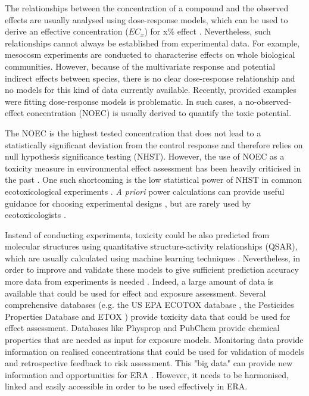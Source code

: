 The relationships between the concentration of a compound and the observed effects are usually analysed using dose-response models, which can be used to derive an effective concentration ($EC_{x}$) for x\% effect  \citep{ritz_toward_2010}. 
Nevertheless, such relationships cannot always be established from experimental data.
For example, mesocosm experiments are conducted to characterise effects on whole biological communities.
However, because of the multivariate response and potential indirect effects between species, there is no clear dose-response relationship and no models for this kind of data currently available. 
Recently, \citet{green_issues_2016} provided examples were fitting dose-response models is problematic. 
In such cases, a no-observed-effect concentration (NOEC) is usually derived to quantify the toxic potential.

The NOEC is the highest tested concentration that does not lead to a statistically significant deviation from the control response and therefore relies on null hypothesis significance testing (NHST). 
However, the use of NOEC as a toxicity measure in environmental effect assessment has been heavily criticised in the past \citep{laskowski_good_1995, chapman_warning:_1996, warne_noec_2008, fox_what_2012, jager_bad_2012, fox_dont_2016}. 
One such shortcoming is the low statistical power of NHST in common ecotoxicological experiments \citep{van_der_hoeven_power_1998}.
\emph{A priori} power calculations can provide useful guidance for choosing experimental designs \citep{johnson_power_2015}, but are rarely used by ecotoxicologists \citep{newman_what_2008}. 

Instead of conducting experiments, toxicity could be also predicted from molecular structures using quantitative structure-activity relationships (QSAR), which are usually calculated using machine learning techniques \citep{breiman_statistical_2001-1, murrell_chemically_2015, cortes-ciriano_bioalerts:_2016}. 
Nevertheless, in order to improve and validate these models to give sufficient prediction accuracy more data from experiments is needed \citep{kuhne_read-across_2013}. 
Indeed, a large amount of data is available that could be used for effect and exposure assessment. 
Several comprehensive databases (e.g. the US EPA ECOTOX database \citep{u.s._epa_ecotoxicology_2016}, the Pesticides Properties Database \citep{lewis_international_2016} and ETOX \citep{umweltbundesamt_etox:_2016}) provide toxicity data that could be used for effect assessment.
Databases like Physprop \citep{howard_physical_2016} and PubChem \citep{kim_pubchem_2016} provide chemical properties that are needed as input for exposure models.
Monitoring data provide information on realised concentrations that could be used for validation of models and retrospective feedback to risk assessment.
This "big data" can provide new information and opportunities for ERA \citep{dafforn_big_2015}. 
However, it needs to be harmonised, linked and easily accessible in order to be used effectively in ERA.



